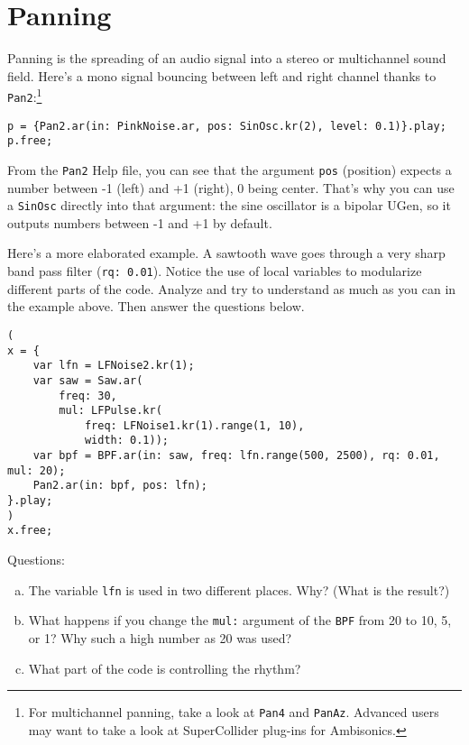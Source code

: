 \section{Panning}

Panning is the spreading of an audio signal into a stereo or multichannel sound field. Here's a mono signal bouncing between left and right channel thanks to \texttt{Pan2}:\footnote{For multichannel panning, take a look at \texttt{Pan4} and \texttt{PanAz}. Advanced users may want to take a look at SuperCollider plug-ins for Ambisonics.}
\begin{lstlisting}[style=SuperCollider-IDE, basicstyle=\scttfamily\footnotesize]
p = {Pan2.ar(in: PinkNoise.ar, pos: SinOsc.kr(2), level: 0.1)}.play;
p.free;
\end{lstlisting}
From the \texttt{Pan2} Help file, you can see that the argument \texttt{pos} (position) expects a number between -1 (left) and +1 (right), 0 being center. That's why you can use a \texttt{SinOsc} directly into that argument: the sine oscillator is a bipolar UGen, so it outputs numbers between -1 and +1 by default.

Here's a more elaborated example. A sawtooth wave goes through a very sharp band pass filter (\texttt{rq: 0.01}). Notice the use of local variables to modularize different parts of the code. Analyze and try to understand as much as you can in the example above. Then answer the questions below.

\begin{lstlisting}[style=SuperCollider-IDE, basicstyle=\scttfamily\footnotesize]
(
x = {
	var lfn = LFNoise2.kr(1);
	var saw = Saw.ar(
		freq: 30, 
		mul: LFPulse.kr(
			freq: LFNoise1.kr(1).range(1, 10),
			width: 0.1));
	var bpf = BPF.ar(in: saw, freq: lfn.range(500, 2500), rq: 0.01, mul: 20);
	Pan2.ar(in: bpf, pos: lfn);
}.play;
)
x.free;
\end{lstlisting}
 
Questions:
\begin{enumerate}[(a)]
\item The variable \texttt{lfn} is used in two different places. Why? (What is the result?)
\item What happens if you change the \texttt{mul:} argument of the \texttt{BPF} from 20 to 10, 5, or 1? Why such a high number as 20 was used?
\item What part of the code is controlling the rhythm?
\end{enumerate}

